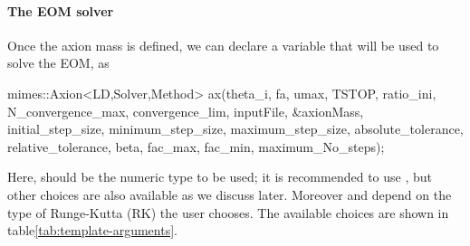 \documentclass[11pt,a4paper]{article}
\begin{document}
\paragraph{The EOM solver}
Once the axion mass is defined, we can declare a variable that will be used to solve the EOM, as
%
\begin{cpp}
	mimes::Axion<LD,Solver,Method> ax(theta_i, fa, umax, TSTOP, ratio_ini, 
		N_convergence_max, convergence_lim, inputFile, &axionMass, initial_step_size,
		minimum_step_size, maximum_step_size, absolute_tolerance, relative_tolerance, 
		beta, fac_max, fac_min, maximum_No_steps);
\end{cpp}
%
Here,  should be the numeric type to be used; it is recommended to use , but other choices are also available as we discuss later. Moreover  and  depend on the type of Runge-Kutta (RK) the user chooses. The available choices are shown in table\ref{tab:template-arguments}. 
\end{document}
